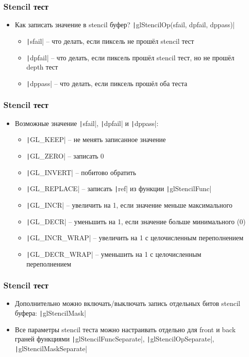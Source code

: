 \documentclass[10pt]{beamer}
\begin{document}
\begin{frame}[fragile]
\frametitle{Stencil тест}
\begin{itemize}
\item Как записать значение в stencil буфер? \pause \texttt|glStencilOp(sfail, dpfail, dppass)|
\pause
\begin{itemize}
\item \texttt|sfail| -- что делать, если пиксель не прошёл stencil тест
\item \texttt|dpfail| -- что делать, если пиксель прошёл stencil тест, но не прошёл depth тест
\item \texttt|dppass| -- что делать, если пиксель прошёл оба теста
\end{itemize}
\end{itemize}
\end{frame}

\begin{frame}[fragile]
\frametitle{Stencil тест}
\begin{itemize}
\item Возможные значение \texttt|sfail|, \texttt|dpfail| и \texttt|dppass|:
\begin{itemize}
\item \texttt|GL_KEEP| -- не менять записанное значение
\item \texttt|GL_ZERO| -- записать 0
\item \texttt|GL_INVERT| -- побитово обратить
\item \texttt|GL_REPLACE| -- записать \texttt|ref| из функции \texttt|glStencilFunc|
\item \texttt|GL_INCR| -- увеличить на 1, если значение меньше максимального
\item \texttt|GL_DECR| -- уменьшить на 1, если значение больше минимального (0)
\item \texttt|GL_INCR_WRAP| -- увеличить на 1 с целочисленным переполнением
\item \texttt|GL_DECR_WRAP| -- уменьшить на 1 с целочисленным переполнением
\end{itemize}
\end{itemize}
\end{frame}

\begin{frame}[fragile]
\frametitle{Stencil тест}
\begin{itemize}
\item Дополнительно можно включать/выключать запись отдельных битов stencil буфера: \texttt|glStencilMask|
\pause
\item Все параметры stencil теста можно настраивать отдельно для front и back граней функциями \texttt|glStencilFuncSeparate|, \texttt|glStencilOpSeparate|, \texttt|glStencilMaskSeparate|
\end{itemize}
\end{frame}
\end{document}
